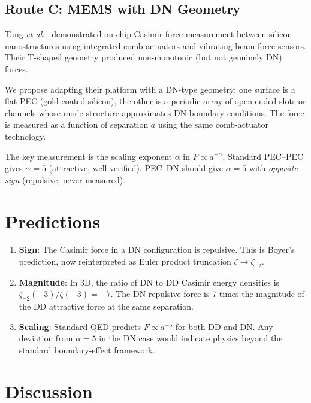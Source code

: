 \documentclass[aps,prd,twocolumn,superscriptaddress,nofootinbib]{revtex4-2}
\begin{document}
\subsection{Route C: MEMS with DN Geometry}

Tang \textit{et al.}~\cite{Tang2017} demonstrated on-chip Casimir
force measurement between silicon nanostructures using integrated
comb actuators and vibrating-beam force sensors.  Their T-shaped
geometry produced non-monotonic (but not genuinely DN) forces.

We propose adapting their platform with a DN-type geometry:
one surface is a flat PEC (gold-coated silicon), the other is a
periodic array of open-ended slots or channels whose mode
structure approximates DN boundary conditions.  The force is
measured as a function of separation $a$ using the same
comb-actuator technology.

The key measurement is the scaling exponent $\alpha$ in
$F\propto a^{-\alpha}$.  Standard PEC--PEC gives $\alpha=5$
(attractive, well verified).  PEC--DN should give $\alpha=5$
with \emph{opposite sign} (repulsive, never measured).

\section{Predictions}

\begin{enumerate}
\item \textbf{Sign}: The Casimir force in a DN configuration is
repulsive.  This is Boyer's prediction, now reinterpreted as
Euler product truncation $\zeta\to\zeta_{\neg 2}$.

\item \textbf{Magnitude}: In 3D, the ratio of DN to DD Casimir
energy densities is $\zeta_{\neg 2}(-3)/\zeta(-3)=-7$.  The DN
repulsive force is 7 times the magnitude of the DD attractive
force at the same separation.

\item \textbf{Scaling}: Standard QED predicts $F\propto a^{-5}$
for both DD and DN.  Any deviation from $\alpha=5$ in the DN
case would indicate physics beyond the standard boundary-effect
framework.
\end{enumerate}

\section{Discussion}
\end{document}
